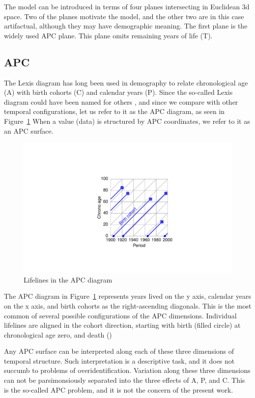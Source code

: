 \documentclass[onehalfspacing]{article}
\begin{document}
The  model can be introduced in terms of four planes intersecting in
Euclidean 3d space. Two of the planes motivate the model, and the other two
are in this case artifactual, although they may have demographic meaning. The
first plane is the widely used APC plane. This plane omits remaining years of
life (T). 

\subsection*{APC}
The Lexis diagram has long been used in demography to relate chronological age
(A) with birth cohorts (C) and calendar years (P). Since the so-called Lexis
diagram could have been named for others
\citep{vandeschrick2001lexis,keiding2011age}, and since we compare with other
temporal configurations, let us refer to it as the APC diagram, as seen in
Figure~\ref{APCright}
When a value (data) is structured by APC coordinates, we refer to it as an APC surface.

\begin{figure}[b!]
    \centering
    \includegraphics[scale=.7]{Figures/LabPres/APC2.pdf}
    \caption{Lifelines in the APC diagram}
    \label{APCright}
\end{figure} 

The APC diagram in Figure~\ref{APCright} represents years lived on the y axis,
calendar years on the x axis, and birth cohorts as the right-ascending
diagonals. This is the most common of several possible configurations
of the APC dimensions. Individual lifelines are aligned in the cohort direction,
starting with birth (filled circle) at chronological age zero, and death ()

Any APC surface can be interpreted along each of these
three dimensions of temporal structure. Such interpretation is a descriptive
task, and it does not succumb to problems of overidentification. Variation along
these three dimensions can not be parsimonsiously separated into the three
effects of A, P, and C. This is the so-called APC problem, and it is not the concern of the
present work. 
\end{document}
